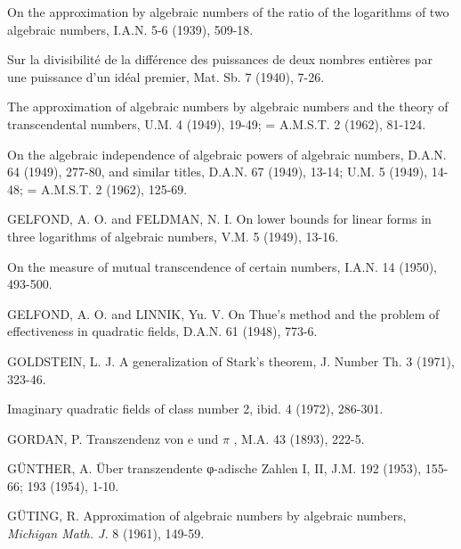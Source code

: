 \begin{hanglist}
    \item \hspace{1.5em} On the approximation by algebraic numbers of the ratio of the logarithms of two algebraic numbers, I.A.N. 5-6 (1939), 509-18.
    \item \hspace{1.5em} Sur la divisibilité de la différence des puissances de deux nombres entières par une puissance d'un idéal premier, Mat. Sb. 7 (1940), 7-26.
    \item \hspace{1.5em} The approximation of algebraic numbers by algebraic numbers and the theory of transcendental numbers, U.M. 4 (1949), 19-49; = A.M.S.T. 2 (1962), 81-124.
    \item \hspace{1.5em} On the algebraic independence of algebraic powers of algebraic numbers, D.A.N. 64 (1949), 277-80, and similar titles, D.A.N. 67 (1949), 13-14; U.M. 5 (1949), 14-48; = A.M.S.T. 2 (1962), 125-69.
    \item GELFOND, A. O. and FELDMAN, N. I. On lower bounds for linear forms in three logarithms of algebraic numbers, V.M. 5 (1949), 13-16.
    \item \hspace{1.5em} On the measure of mutual transcendence of certain numbers, I.A.N. 14 (1950), 493-500.
    \item GELFOND, A. O. and LINNIK, Yu. V. On Thue's method and the problem of effectiveness in quadratic fields, D.A.N. 61 (1948), 773-6.
    \item GOLDSTEIN, L. J. A generalization of Stark's theorem, J. Number Th. 3 (1971), 323-46.
    \item \hspace{1.5em} Imaginary quadratic fields of class number 2, ibid. 4 (1972), 286-301.
    \item GORDAN, P. Transzendenz von e und  $\pi$ , M.A. 43 (1893), 222-5.
    \item GÜNTHER, A. Über transzendente φ-adische Zahlen I, II, J.M. 192 (1953), 155-66; 193 (1954), 1-10.
    \item GÜTING, R. Approximation of algebraic numbers by algebraic numbers, \textit{Michigan Math. J.} 8 (1961), 149-59.

\end{hanglist}
